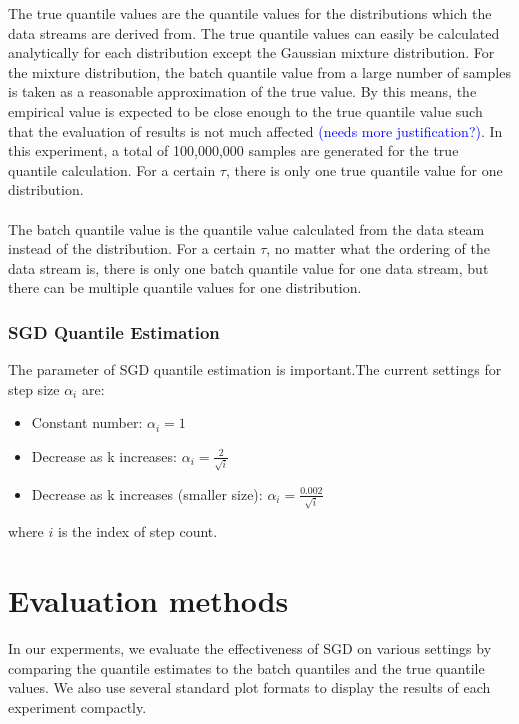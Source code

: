 The true quantile values are the quantile values for the distributions which the data streams are derived from. The true quantile values can easily be calculated analytically for each distribution except the Gaussian mixture distribution. For the mixture distribution, the batch quantile value from a large number of samples is taken as a reasonable approximation of the true value. By this means, the empirical value is expected to be close enough to the true quantile value such that the evaluation of results is not much affected \textcolor{blue}{(needs more justification?)}. In this experiment, a total of 100,000,000 samples are generated for the true quantile calculation. For a certain $\tau$, there is only one true quantile value for one distribution.
\\\\
The batch quantile value is the quantile value calculated from the data steam instead of the distribution. For a certain $\tau$, no matter what the ordering of the data stream is, there is only one batch quantile value for one data stream, but there can be multiple quantile values for one distribution.

\subsubsection{SGD Quantile Estimation}

The parameter of SGD quantile estimation is important.The current settings for step size $\alpha_i$ are:
\begin{itemize}
    \item Constant number: $\alpha_i =1$
    \item Decrease as k increases: $\alpha_i= \frac{2}{\sqrt{i}}$
    \item Decrease as k increases (smaller size): $\alpha_i= \frac{0.002}{\sqrt{i}}$
\end{itemize}
where $i$ is the index of step count.

\section{Evaluation methods}
\label{sec: evaluation}
In our experments, we evaluate the effectiveness of SGD on various settings by comparing the quantile estimates to the batch quantiles and the true quantile values. We also use several standard plot formats to display the results of each experiment compactly. 

